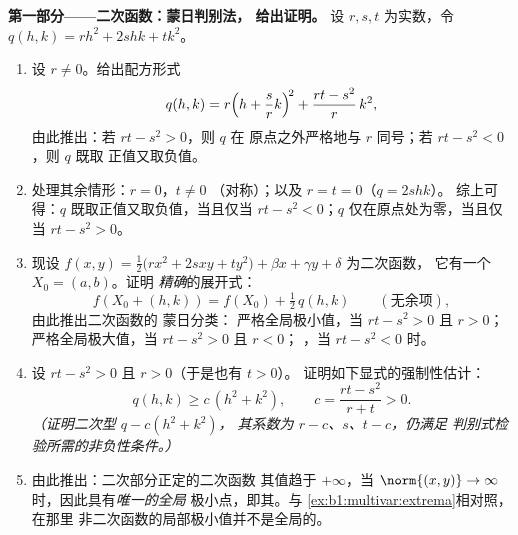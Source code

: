 \begin{problem}
\medskip
\noindent\textbf{第一部分——二次函数：蒙日判别法，
给出证明。} 设 $r, s, t$ 为实数，令 $q(h, k) = r h^2 + 2s hk +
t k^2$。
\begin{enumerate}
  \item 设 $r \neq 0$。给出配方形式
        \[
        q(h, k) = r\Bigl(h + \frac{s}{r}k\Bigr)^{\!2}
        + \frac{rt - s^2}{r}\,k^2 ,
        \]
        由此推出：若 $rt - s^2 > 0$，则 $q$ 在
        原点之外严格地与 $r$ 同号；若 $rt - s^2 < 0$，则 $q$ 既取
        正值又取负值。
  \item 处理其余情形：$r = 0$，$t \neq 0$
        （对称）；以及 $r = t = 0$（$q = 2shk$）。
        综上可得：$q$ 既取正值又取负值，当且仅当 $rt - s^2 < 0$；$q$
        仅在原点处为零，当且仅当 $rt - s^2 > 0$。
  \item 现设 $f(x, y) = \frac12\bigl(r x^2 + 2s xy + t
        y^2\bigr) + \beta x + \gamma y + \delta$ 为二次函数，
        它有一个 $X_0 = (a, b)$。证明
        \emph{精确}的展开式：
        \[
        f(X_0 + (h,k)) = f(X_0) + \tfrac12\,q(h, k)
        \qquad (\text{无余项}),
        \]
        由此推出二次函数的 蒙日分类：
        严格全局极小值，当 $rt - s^2 > 0$ 且 $r >
        0$；严格全局极大值，当 $rt - s^2 > 0$ 且 $r < 0$；
        ，当 $rt - s^2 < 0$ 时。
  \item 设 $rt - s^2 > 0$ 且 $r > 0$（于是也有 $t > 0$）。
        证明如下显式的强制性估计：
        \[
        q(h, k) \geq c\,(h^2 + k^2),
        \qquad
        c = \frac{rt - s^2}{r + t} > 0 .
        \]
        \emph{（证明二次型 $q - c(h^2 + k^2)$，
        其系数为 $r - c$、$s$、$t - c$，仍满足
        判别式检验所需的非负性条件。）}
  \item 由此推出：二次部分正定的二次函数
        其值趋于 $+\infty$，当 $\norm{(x,y)} \to
        \infty$ 时，因此具有\emph{唯一的全局}
        极小点，即其。与
        \cref{ex:b1:multivar:extrema}相对照，在那里
        非二次函数的局部极小值并不是全局的。
\end{enumerate}


\end{problem}
